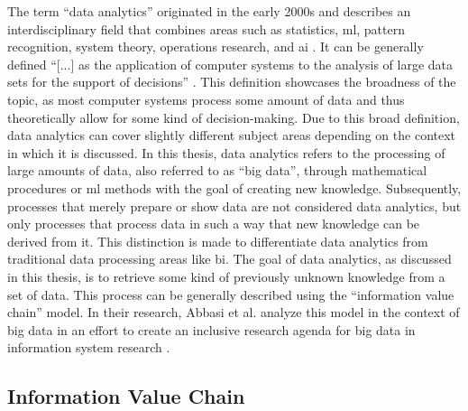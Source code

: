 The term \enquote{data analytics} originated in the early 2000s and describes an interdisciplinary field that combines areas such as statistics, \ac{ml}, pattern recognition, system theory, operations research, and \ac{ai} \parencite{Runkler.2020}. It can be generally defined \enquote{[...] as the application of computer systems to the analysis of large data sets for the support of decisions} \parencite{Runkler.2020}. This definition showcases the broadness of the topic, as most computer systems process some amount of data and thus theoretically allow for some kind of decision-making. Due to this broad definition, data analytics can cover slightly different subject areas depending on the context in which it is discussed. In this thesis, data analytics refers to the processing of large amounts of data, also referred to as \enquote{big data}, through mathematical procedures or \ac{ml} methods with the goal of creating new knowledge. Subsequently, processes that merely prepare or show data are not considered data analytics, but only processes that process data in such a way that new knowledge can be derived from it. This distinction is made to differentiate data analytics from traditional data processing areas like \ac{bi}. The goal of data analytics, as discussed in this thesis, is to retrieve some kind of previously unknown knowledge from a set of data. This process can be generally described using the \enquote{information value chain} model. In their research, Abbasi et al. analyze this model in the context of big data in an effort to create an inclusive research agenda for big data in information system research \parencite{Abbasi.2016}.

\subsection{Information Value Chain}
\label{subsec:informationValueChainSubSection}

